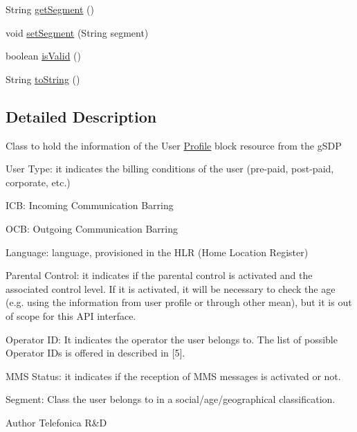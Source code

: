 \begin{DoxyCompactItemize}
\item 
String \hyperlink{classcom_1_1bluevia_1_1directory_1_1data_1_1Profile_a51c7d159f411b65e66857ee6e3c320e9}{getSegment} ()
\item 
void \hyperlink{classcom_1_1bluevia_1_1directory_1_1data_1_1Profile_a1d602d051ffcfb94a79d24eed08b0d6a}{setSegment} (String segment)
\item 
boolean \hyperlink{classcom_1_1bluevia_1_1directory_1_1data_1_1Profile_a1efb43a459704f936735d032014e57db}{isValid} ()
\item 
String \hyperlink{classcom_1_1bluevia_1_1directory_1_1data_1_1Profile_ac3a496aeeefa604a7a21ac44e5838718}{toString} ()
\end{DoxyCompactItemize}


\subsection{Detailed Description}
Class to hold the information of the User \hyperlink{classcom_1_1bluevia_1_1directory_1_1data_1_1Profile}{Profile} block resource from the gSDP 
\begin{DoxyItemize}
\item User Type: it indicates the billing conditions of the user (pre-\/paid, post-\/paid, corporate, etc.) 
\item ICB: Incoming Communication Barring 
\item OCB: Outgoing Communication Barring 
\item Language: language, provisioned in the HLR (Home Location Register) 
\item Parental Control: it indicates if the parental control is activated and the associated control level. If it is activated, it will be necessary to check the age (e.g. using the information from user profile or through other mean), but it is out of scope for this API interface. 
\item Operator ID: It indicates the operator the user belongs to. The list of possible Operator IDs is offered in described in \mbox{[}5\mbox{]}. 
\item MMS Status: it indicates if the reception of MMS messages is activated or not. 
\item Segment: Class the user belongs to in a social/age/geographical classification. 
\end{DoxyItemize}

\begin{DoxyAuthor}{Author}
Telefonica R\&D 
\end{DoxyAuthor}



